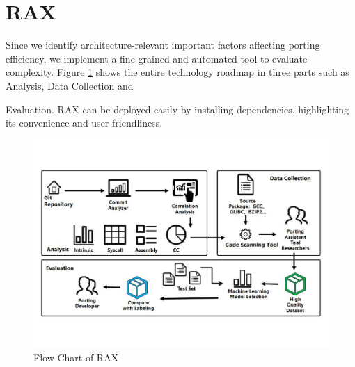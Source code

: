 \documentclass[sigconf,screen,review,anonymous]{acmart}
\begin{document}
\section{RAX}
Since we identify architecture-relevant important factors affecting porting efficiency, we implement a fine-grained and automated tool to evaluate complexity. Figure \ref{fig:figure1} shows the entire technology roadmap in three parts such as Analysis, Data Collection and {Evaluation. RAX can be deployed easily by installing dependencies, highlighting its convenience and user-friendliness.


\begin{figure}
  \centering
  \includegraphics[width=\linewidth]{figure1.pdf}
  \caption{Flow Chart of RAX}
  \label{fig:figure1}
\end{figure}

}
\end{document}
